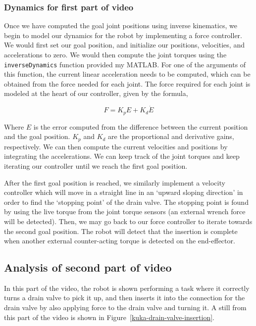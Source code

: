 \documentclass[conference]{IEEEtran}
\begin{document}
\subsubsection{Dynamics for first part of video}

Once we have computed the goal joint positions using inverse kinematics, we begin 
to model our dynamics for the robot by implementing a force controller. We would
first set our goal position, and initialize our positions, velocities, and accelerations
to zero. We would then compute the joint torques using the \texttt{inverseDynamics}
function provided my MATLAB. For one of the arguments of this function, the current linear acceleration needs to be
computed, which can be obtained from the force needed for each joint. The force required
for each joint is modeled at the heart of our controller, given by the formula,

\[
    F = K_p E + K_d \dot{E}
\]

Where $E$ is the error computed from the difference between the current position and
the goal position. $K_p$ and $K_d$ are the proportional and derivative gains, respectively.
We can then compute the current velocities and positions by integrating the accelerations.
We can keep track of the joint torques and keep iterating our controller until we reach the first goal
position.

After the first goal position is reached, we similarly implement a velocity controller
which will move in a straight line in an `upward sloping direction' in order to find the
`stopping point' of the drain valve. The stopping point is found by using the live torque from
the joint torque sensors (an external wrench force will be detected). Then, we may go back to
our force controller to iterate towards the second goal position. The robot will detect that
the insertion is complete when another external counter-acting torque is detected on the end-effector.

\subsection{Analysis of second part of video}

In this part of the video, the robot is shown performing a task where it correctly
turns a drain valve to pick it up, and then inserts it into the connection for the
drain valve by also applying force to the drain valve and turning it. A still from
this part of the video is shown in Figure~\ref{kuka-drain-valve-insertion}.
\end{document}
